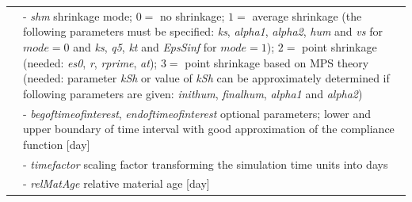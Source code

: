 \documentclass[a4paper]{article}
\newcommand{\param}[1]{{\it #1}}
\begin{document}
\begin{table}[!htb]
\begin{tabular}{|l|p{9cm}|}
&- \param{shm} shrinkage mode;
$0=$ no shrinkage;
$1=$ average shrinkage (the following parameters must be specified: \param{ks}, \param{alpha1}, \param{alpha2}, \param{hum} and \param{vs} for $mode = 0$ and \param{ks}, \param{q5}, \param{kt} and \param{EpsSinf} for $mode=1$);
$2=$ point shrinkage (needed: \param{es0}, \param{r}, \param{rprime}, \param{at});
$3=$ point shrinkage based on MPS theory (needed: parameter \param{kSh} or value of \param{kSh} can be approximately determined if following parameters are given: \param{inithum}, \param{finalhum}, \param{alpha1} and \param{alpha2})\\

&- \param{begoftimeofinterest}, \param{endoftimeofinterest} optional parameters; lower and upper boundary of time interval with good approximation of the compliance function [day]\\
&- \param{timefactor} scaling factor transforming the simulation time units into days\\
&- \param{relMatAge} relative material age [day]\\
\hline
\end{tabular}
\end{table}
\end{document}
